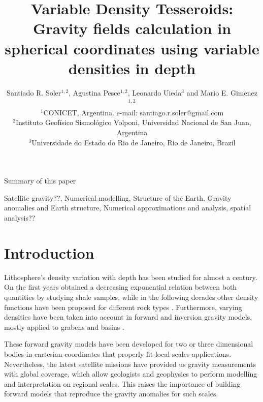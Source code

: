 \documentclass[extra]{gji}
\begin{document}
\title[Variable Density Tesseroids]{
    Variable Density Tesseroids: Gravity fields calculation in spherical coordinates using variable densities in depth
}
\author[S.R. Soler, A. Pesce, L. Uieda and M.E. Gimenez]{
    Santiado R. Soler$^{1,2}$, Agustina Pesce$^{1,2}$, Leonardo Uieda$^3$ and Mario E. Gimenez$^{1,2}$ \\
    $^1$CONICET, Argentina. e-mail: santiago.r.soler@gmail.com\\
    $^2$Instituto Geofísico Sismológico Volponi, Universidad Nacional de San Juan, Argentina\\
    $^3$Universidade do Estado do Rio de Janeiro, Rio de Janeiro, Brazil
    }


\maketitle

\begin{summary}
Summary of this paper 
\end{summary}

\begin{keywords}
Satellite gravity??, Numerical modelling, Structure of the Earth, Gravity anomalies and Earth structure, Numerical approximations and analysis, spatial analysis??
\end{keywords}


\section{Introduction}

Lithosphere's density variation with depth has been studied for almost a century. 
On the first years \citet{Athy1930} obtained a decreasing exponential relation between both quantities by studying shale samples, while in the following decades other density functions have been proposed for different rock types \citep[e.g.,][]{Maxant1980, Rao1986, Rao1993, Rao1994}.
Furthermore, varying densities have been taken into account in forward and inversion gravity models, mostly applied to grabens and basins \citep{Cordell1973, Rao1986, Cowie1990, Rao1993, Rao1994, Zhang2001, Welford2010}.

These forward gravity models have been developed for two or three dimensional bodies in cartesian coordinates that properly fit local scales applications.
Nevertheless, the latest satellite missions have provided us gravity measurements with global coverage, which allow geologists and geophysics to perform modelling and interpretation on regional scales.
This raises the importance of building forward models that reproduce the gravity anomalies for such scales.
\end{document}
